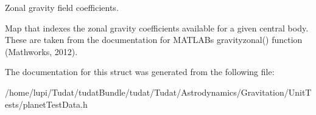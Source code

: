 Zonal gravity field coefficients. 

Map that indexes the zonal gravity coefficients available for a given central body. These are taken from the documentation for M\+A\+T\+L\+AB\textquotesingle{}s gravityzonal() function (Mathworks, 2012). 

The documentation for this struct was generated from the following file\+:\begin{DoxyCompactItemize}
\item 
/home/lupi/\+Tudat/tudat\+Bundle/tudat/\+Tudat/\+Astrodynamics/\+Gravitation/\+Unit\+Tests/planet\+Test\+Data.\+h\end{DoxyCompactItemize}

